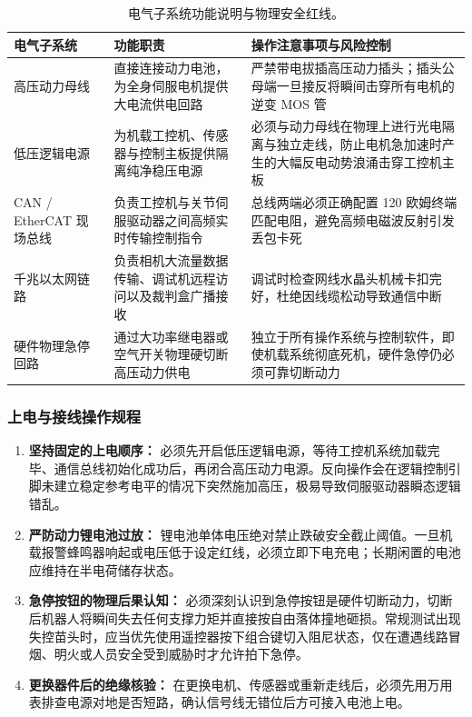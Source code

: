 \begin{table}[H]
\centering
\small
\begin{tabularx}{\textwidth}{p{2.8cm} p{4.6cm} X}
\toprule
\textbf{电气子系统} & \textbf{功能职责} & \textbf{操作注意事项与风险控制} \\
\midrule
高压动力母线 & 直接连接动力电池，为全身伺服电机提供大电流供电回路 & 严禁带电拔插高压动力插头；插头公母端一旦接反将瞬间击穿所有电机的逆变 MOS 管 \\
\addlinespace
低压逻辑电源 & 为机载工控机、传感器与控制主板提供隔离纯净稳压电源 & 必须与动力母线在物理上进行光电隔离与独立走线，防止电机急加速时产生的大幅反电动势浪涌击穿工控机主板 \\
\addlinespace
CAN / EtherCAT 现场总线 & 负责工控机与关节伺服驱动器之间高频实时传输控制指令 & 总线两端必须正确配置 120 欧姆终端匹配电阻，避免高频电磁波反射引发丢包卡死 \\
\addlinespace
千兆以太网链路 & 负责相机大流量数据传输、调试机远程访问以及裁判盒广播接收 & 调试时检查网线水晶头机械卡扣完好，杜绝因线缆松动导致通信中断 \\
\addlinespace
硬件物理急停回路 & 通过大功率继电器或空气开关物理硬切断高压动力供电 & 独立于所有操作系统与控制软件，即使机载系统彻底死机，硬件急停仍必须可靠切断动力 \\
\bottomrule
\end{tabularx}
\caption{电气子系统功能说明与物理安全红线。}
\end{table}

\subsubsection{上电与接线操作规程}

\begin{enumerate}[leftmargin=*]
    \item \textbf{坚持固定的上电顺序：} 必须先开启低压逻辑电源，等待工控机系统加载完毕、通信总线初始化成功后，再闭合高压动力电源。反向操作会在逻辑控制引脚未建立稳定参考电平的情况下突然施加高压，极易导致伺服驱动器瞬态逻辑错乱。
    \item \textbf{严防动力锂电池过放：} 锂电池单体电压绝对禁止跌破安全截止阈值。一旦机载报警蜂鸣器响起或电压低于设定红线，必须立即下电充电；长期闲置的电池应维持在半电荷储存状态。
    \item \textbf{急停按钮的物理后果认知：} 必须深刻认识到急停按钮是硬件切断动力，切断后机器人将瞬间失去任何支撑力矩并直接按自由落体撞地砸损。常规测试出现失控苗头时，应当优先使用遥控器按下组合键切入阻尼状态，仅在遭遇线路冒烟、明火或人员安全受到威胁时才允许拍下急停。
    \item \textbf{更换器件后的绝缘核验：} 在更换电机、传感器或重新走线后，必须先用万用表排查电源对地是否短路，确认信号线无错位后方可接入电池上电。
\end{enumerate}


